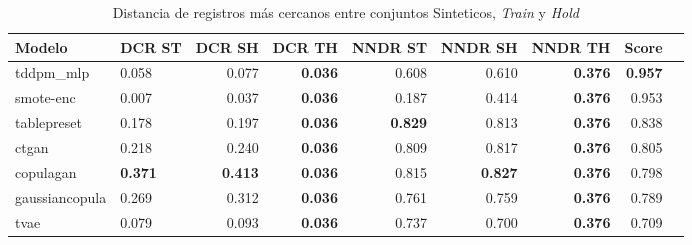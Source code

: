 \begin{table}[H]
\centering
\caption{Distancia de registros más cercanos entre conjuntos Sinteticos, \emph{Train} y \emph{Hold}}
\label{table-dcr-king county-a-3}
\begin{tabular}{|l|l|r|r|r|r|r|r|r|}
\hline
\rowcolor[gray]{0.8}
Modelo & DCR ST & DCR SH & DCR TH & NNDR ST & NNDR SH & NNDR TH & \textbf{Score} \\
\hline tddpm\_mlp & 0.058 & 0.077 & \bfseries 0.036 & 0.608 & 0.610 & \bfseries 0.376 & \bfseries 0.957 \\
\hline smote-enc & \cellcolor[rgb]{0.9, 0.54, 0.52} 0.007 & \cellcolor[rgb]{0.9, 0.54, 0.52} 0.037 & \bfseries 0.036 & 0.187 & 0.414 & \bfseries 0.376 & 0.953 \\
\hline tablepreset & 0.178 & 0.197 & \bfseries 0.036 & \bfseries 0.829 & 0.813 & \bfseries 0.376 & 0.838 \\
\hline ctgan & 0.218 & 0.240 & \bfseries 0.036 & 0.809 & 0.817 & \bfseries 0.376 & 0.805 \\
\hline copulagan & \bfseries 0.371 & \bfseries 0.413 & \bfseries 0.036 & 0.815 & \bfseries 0.827 & \bfseries 0.376 & 0.798 \\
\hline gaussiancopula & 0.269 & 0.312 & \bfseries 0.036 & 0.761 & 0.759 & \bfseries 0.376 & 0.789 \\
\hline tvae & 0.079 & 0.093 & \bfseries 0.036 & 0.737 & 0.700 & \bfseries 0.376 & 0.709 \\
\hline
\end{tabular}
\end{table}
